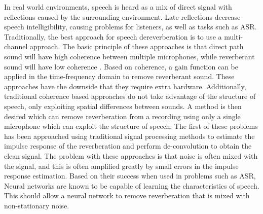 In real world environments, speech is heard as a mix of direct signal with reflections caused by the surrounding environment. Late reflections decrease speech intelligibility, causing problems for listeners, as well as tasks such as \ac{ASR}. Traditionally, the best approach for speech dereverberation is to use a multi-channel approach. The basic principle of these approaches is that direct path sound will have high coherence between multiple microphones, while reverberant sound will have low coherence \cite{buchholz}. Based on coherence, a gain function can be applied in the time-frequency domain to remove reverberant sound. These approaches have the downside that they require extra hardware. Additionally, traditional coherence based approaches do not take advantage of the structure of speech, only exploiting spatial differences between sounds. A method is then desired which can remove reverberation from a recording using only a single microphone which can exploit the structure of speech. The first of these problems has been approached using traditional signal processing methods to estimate the impulse response of the reverberation and perform de-convolution to obtain the clean signal. The problem with these approaches is that noise is often mixed with the signal, and this is often amplified greatly by small errors in the impulse response estimation. Based on their success when used in problems such as \ac{ASR}, Neural networks are known to be capable of learning the characteristics of speech. This should allow a neural network to remove reverberation that is mixed with non-stationary noise.
